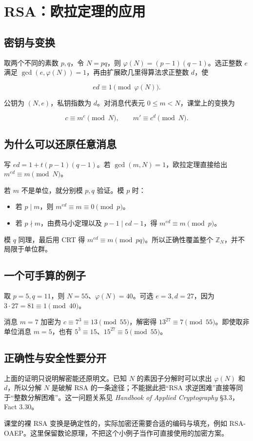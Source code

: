\section{RSA：欧拉定理的应用}


\subsection{密钥与变换}


取两个不同的素数 $p,q$，令 $N=pq$，则 $\varphi(N)=(p-1)(q-1)$。选正整数 $e$ 满足 $\gcd(e,\varphi(N))=1$，再由扩展欧几里得算法求正整数 $d$，使

\[
ed\equiv1\pmod{\varphi(N)}.
\]

公钥为 $(N,e)$，私钥指数为 $d$。对消息代表元 $0\le m<N$，课堂上的变换为

\[
c\equiv m^e\pmod N,\qquad m'\equiv c^d\pmod N.
\]

\subsection{为什么可以还原任意消息}


写 $ed=1+t(p-1)(q-1)$。若 $\gcd(m,N)=1$，欧拉定理直接给出 $m^{ed}\equiv m\pmod N$。

若 $m$ 不是单位，就分别模 $p,q$ 验证。模 $p$ 时：

\begin{itemize}
\item 若 $p\mid m$，则 $m^{ed}\equiv m\equiv0\pmod p$。
\item 若 $p\nmid m$，由费马小定理以及 $p-1\mid ed-1$，得 $m^{ed}\equiv m\pmod p$。
\end{itemize}


模 $q$ 同理，最后用 CRT 得 $m^{ed}\equiv m\pmod{pq}$。所以正确性覆盖整个 $\mathbb Z_N$，并不局限于单位群。

\subsection{一个可手算的例子}


取 $p=5,q=11$，则 $N=55$、$\varphi(N)=40$。可选 $e=3,d=27$，因为 $3\cdot27=81\equiv1\pmod{40}$。

消息 $m=7$ 加密为 $c\equiv7^3\equiv13\pmod{55}$，解密得 $13^{27}\equiv7\pmod{55}$。即使取非单位消息 $m=5$，也有 $5^3\equiv15$、$15^{27}\equiv5\pmod{55}$。

\subsection{正确性与安全性要分开}


上面的证明只说明解密能还原明文。已知 $N$ 的素因子分解时可以求出 $\varphi(N)$ 和 $d$，所以分解 $N$ 是破解 RSA 的一条途径；不能据此把“RSA 求逆困难”直接等同于“整数分解困难”。这一问题关系见 \emph{Handbook of Applied Cryptography} §3.3，Fact 3.30。

课堂的裸 RSA 变换是确定性的，实际加密还需要合适的编码与填充，例如 RSA-OAEP。这里保留数论原理，不把这个小例子当作可直接使用的加密方案。
